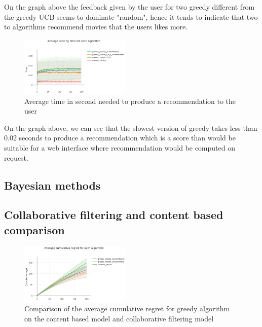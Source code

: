 \documentclass[letterpaper]{article}
\begin{document}
On the graph above the feedback given by the user for two greedy different from the greedy UCB seems to dominate "random", hence it tends to indicate that two to algorithms recommend movies that the users likes more.

\begin{figure}[H]
\begin{center}
\includegraphics[width=0.47\textwidth]{img/greedy3.png}
\caption{Average time in second needed to produce a recommendation to the user}
\label{greedy3}
\end{center}
\end{figure}

On the graph above, we can see that the slowest version of greedy takes less than 0.02 seconds to produce a recommendation which is a score than would be suitable for a web interface where recommendation would be computed on request.


\subsection{Bayesian methods}



\subsection{Collaborative filtering and content based comparison}

\begin{figure}[H]
\begin{center}
\includegraphics[width=0.47\textwidth]{img/collabo1.png}
\caption{Comparison of the average cumulative regret for greedy algorithm on the content based model and collaborative filtering model}
\label{schema}
\end{center}
\end{figure}
\end{document}

